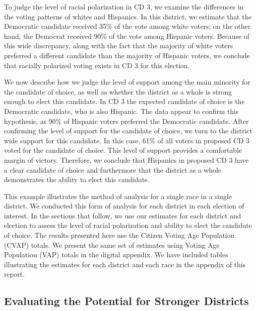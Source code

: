 \documentclass[12pt,draft]{scrartcl}
\begin{document}

To judge the level of racial polarization in CD 3, we examine the
differences in the voting patterns of whites and Hispanics. In this
district, we estimate that the Democratic candidate received 35\% of
the vote among white voters; on the other hand, the Democrat received
90\% of the vote among Hispanic voters. Because of this wide
discrepancy, along with the fact that the majority of white voters
preferred a different candidate than the majority of Hispanic voters,
we conclude that racially polarized voting exists in CD 3 for this
election.

We now describe how we judge the level of support among the main
minority for the candidate of choice, as well as whether the district
as a whole is strong enough to elect this candidate. In CD 3 the
expected candidate of choice is the Democratic candidate, who is also
Hispanic. The data appear to confirm this hypothesis, as 90\% of
Hispanic voters preferred the Democratic candidate. After confirming
the level of support for the candidate of choice, we turn to the
district wide support for this candidate. In this case, 61\% of all
voters in proposed CD 3 voted for the candidate of choice. This level
of support provides a comfortable margin of victory. Therefore, we
conclude that Hispanics in proposed CD 3 have a clear candidate of
choice and furthermore that the district as a whole demonstrates the
ability to elect this candidate.

This example illustrates the method of analysis for a single race in a
single district. We conducted this form of analysis for each district
in each election of interest. In the sections that follow, we use our
estimates for each district and election to assess the level of racial
polarization and ability to elect the candidate of choice.  The
results presented here use the Citizen Voting Age Population (CVAP)
totals. We present the same set of estimates using Voting Age
Population (VAP) totals in the digital appendix.  We have included
tables illustrating the estimates for each district and each race in
the appendix of this report.

\subsection{Evaluating the Potential for Stronger Districts}
\end{document}
